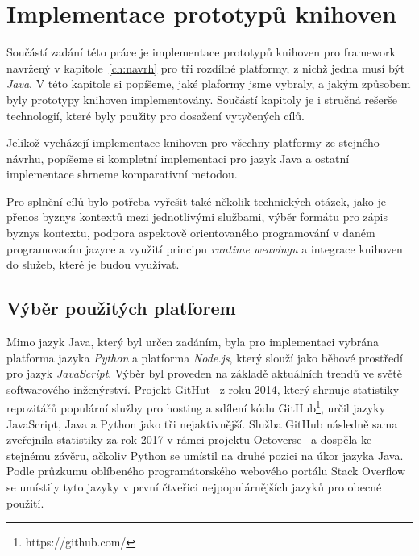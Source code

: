 

\chapter{Implementace prototypů knihoven}\label{ch:implementace}

Součástí zadání této práce je implementace prototypů
knihoven pro framework navržený v kapitole~\ref{ch:navrh}
pro tři rozdílné platformy, z nichž jedna musí být \textit{Java}.
V této kapitole si popíšeme, jaké plaformy jsme vybraly, a jakým
způsobem byly prototypy knihoven implementovány. Součástí
kapitoly je i stručná rešerše technologií, které byly použity
pro dosažení vytyčených cílů.

Jelikož vycházejí implementace knihoven pro všechny platformy
ze stejného návrhu, popíšeme si kompletní implementaci pro jazyk
Java a ostatní implementace shrneme komparativní metodou.

Pro splnění cílů bylo potřeba vyřešit také několik technických otázek,
jako je přenos byznys kontextů mezi jednotlivými službami, výběr formátu
pro zápis byznys kontextu, podpora aspektově orientovaného programování
v daném programovacím jazyce a využití principu \textit{runtime weavingu}
a integrace knihoven do služeb, které je budou využívat.

\section{Výběr použitých platforem}

Mimo jazyk Java, který byl určen zadáním, byla pro
implementaci vybrána platforma jazyka \textit{Python}
a platforma \textit{Node.js}, který slouží jako
běhové prostředí pro jazyk \textit{JavaScript}.
Výběr byl proveden na základě aktuálních trendů
ve světě softwarového inženýrství. Projekt GitHut~\cite{githut}
z roku 2014, který shrnuje statistiky repozitářů
populární služby pro hosting a sdílení kódu
GitHub\footnote{https://github.com/}, určil
jazyky JavaScript, Java a Python jako tři nejaktivnější.
Služba GitHub následně sama zveřejnila statistiky za rok 2017
v rámci projektu Octoverse~\cite{octoverse}
a dospěla ke stejnému závěru, ačkoliv Python se umístil na druhé
pozici na úkor jazyka Java. Podle průzkumu oblíbeného
programátorského webového portálu Stack
Overflow~\cite{stackoverflowsurvey} se umístily tyto jazyky
v první čtveřici nejpopulárnějších jazyků pro obecné použití.

